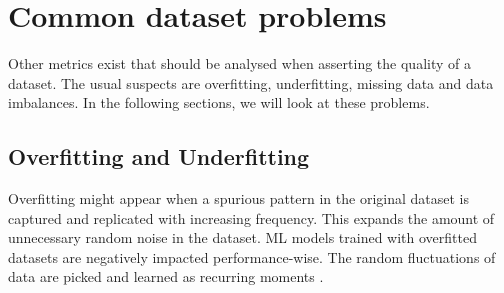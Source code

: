 \begin{comment}
\subsection{Comparison}
The measures presented before were analysed (alongside other metrics) by \cite{oh2011new}. They performed a series of analysis tests on 6 different datasets. The quality of this sets can be describe as follows: \(D_{1}>D_{2}>D_{3}>D_{4}>D_{5}>D_{6}\). The results can be seen in Fig. \ref{fig:dist_metrics}

\begin{figure}
  \begin{center}
    \leavevmode
    \texttt{[image: metrics evaluation.jpg]}
    \caption[Evaluation of distance metrics for dataset classification]{Evaluation of distance metrics for dataset classification \cite{oh2011new}}
    \label{fig:dist_metrics}
  \end{center}
\end{figure}
The relevant data to our study is the one related to the EDM (Euclidean distance measure), MDM (Manhattan distance measure) and HDM (Hausdorff Distance Measure). As we know that the datasets are numbered by highest quality to lowest quality, we can see that EDM proved more correct tham the others, with MDM having some problems with quantifying the quality of the 1st dataset and HDM performing the worst, being unable to identify major diferences betewenn the qualities if the datasets 2 to 5.

The other two methods displayed are used in feature selection.
\end{comment}

\section{Common dataset problems}
Other metrics exist that should be analysed when asserting the quality of a dataset. The usual suspects are overfitting, underfitting, missing data and data imbalances. In the following sections, we will look at these problems.

\subsection{Overfitting and Underfitting}
Overfitting might appear when a spurious pattern in the original dataset is captured and replicated with increasing frequency. This expands the amount of unnecessary random noise in the dataset. ML models trained with overfitted datasets are negatively impacted performance-wise. The random fluctuations of data are picked and learned as recurring moments \citep{over}.

